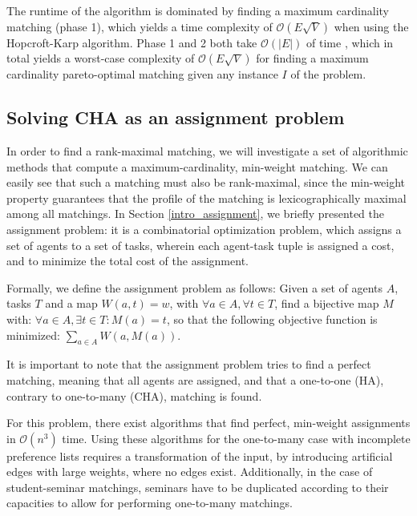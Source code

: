The runtime of the algorithm is dominated by finding a maximum cardinality matching (phase 1), which yields a time complexity of $\mathcal{O}(E\sqrt{V})$ \cite{Abraham:Pacha} when using the Hopcroft-Karp algorithm. Phase 1 and 2 both take $\mathcal{O}(|E|)$ of time \cite{SngThesis}, which in total yields a worst-case complexity of $\mathcal{O}(E\sqrt{V})$ for finding a maximum cardinality pareto-optimal matching given any instance $I$ of the problem.

\subsection{Solving CHA as an assignment problem}\label{algo:assignment}
In order to find a rank-maximal matching, we will investigate a set of algorithmic methods that compute a maximum-cardinality, min-weight matching. We can easily see that such a matching must also be rank-maximal, since the min-weight property guarantees that the profile of the matching is lexicographically maximal among all matchings.
In Section \ref{intro_assignment}, we briefly presented the assignment problem: it is a combinatorial optimization problem, which assigns a set of agents to a set of tasks, wherein each agent-task tuple is assigned a cost, and to minimize the total cost of the assignment. 


Formally, we define the assignment problem as follows: Given a set of agents $A$, tasks $T$ and a map $W(a, t) = w$, with $\forall a \in A, \forall t \in T$, find a bijective map $M$ with: $\forall a \in A, \exists t \in T: M(a) = t$, so that the following objective function is minimized: $\sum_{a \in A} W(a, M(a))$. 

It is important to note that the assignment problem tries to find a perfect matching, meaning that all agents are assigned, and that a one-to-one (HA), contrary to one-to-many (CHA), matching is found.

For this problem, there exist algorithms \cite{Munkres, Jonker1987} that find perfect, min-weight assignments in $\mathcal{O}(n^3)$ time. Using these algorithms for the one-to-many case with incomplete preference lists requires a transformation of the input, by introducing artificial edges with large weights, where no edges exist. Additionally, in the case of student-seminar matchings, seminars have to be duplicated according to their capacities to allow for performing one-to-many matchings.
  
